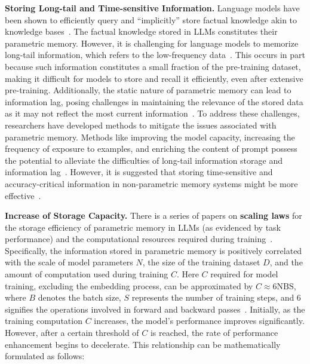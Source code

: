 \documentclass[journal,hideappendix]{vgtc}
\newenvironment{j_itemize}{
\begin{itemize}[]
  \setlength{\itemsep}{3pt}
  \setlength{\parskip}{0pt}
  \setlength{\parsep}{0pt}
}{\end{itemize}}
\begin{document}
\begin{j_itemize}
    \item[$\bullet$] \textbf{Storing Long-tail and Time-sensitive Information.} Language models have been shown to efficiently query and ``implicitly'' store factual knowledge akin to knowledge bases~\cite{robertsetal2020much, heinzerlinginui2021language, yu2023generate}.
    The factual knowledge stored in LLMs constitutes their parametric memory.
    However, it is challenging for language models to memorize long-tail information, which refers to the low-frequency data~\cite{kandpal2023large,mallen2023trust}. This occurs in part because such information constitutes a small fraction of the pre-training dataset, making it difficult for models to store and recall it efficiently, even after extensive pre-training.
    Additionally, the static nature of parametric memory can lead to information lag, posing challenges in maintaining the relevance of the stored data as it may not reflect the most current information~\cite{lewis2020retrieval,kasai2024realtime}.
    To address these challenges, researchers have developed methods to mitigate the issues associated with parametric memory.
    Methods like improving the model capacity, increasing the frequency of exposure to examples, and enriching the content of prompt possess the potential to alleviate the difficulties of long-tail information storage and information lag~\cite{carlini2023quantifying}.
    However, it is suggested that storing time-sensitive and accuracy-critical information in non-parametric memory systems might be more effective~\cite{lewis2020retrieval,mallen2023trust,kasai2024realtime}.
    
    \item[$\bullet$] \textbf{Increase of Storage Capacity.} 
    There is a series of papers on \textbf{scaling laws} for the storage efficiency of parametric memory in LLMs (as evidenced by task performance) and the computational resources required during training~\cite{kaplan2020scaling,zhai2022scaling}. 
    Specifically, the information stored in parametric memory is positively correlated with the scale of model parameters $N$, the size of the training dataset $D$, and the amount of computation used during training $C$. Here $C$ required for model training, excluding the embedding process, can be approximated by $C \approx 6\text{NBS}$, where $B$ denotes the batch size, $S$ represents the number of training steps, and 6 signifies the operations involved in forward and backward passes~\cite{kaplan2020scaling}. Initially, as the training computation $C$ increases, the model's performance improves significantly. However, after a certain threshold of $C$ is reached, the rate of performance enhancement begins to decelerate. This relationship can be mathematically formulated as follows:


\end{j_itemize}
\end{document}
